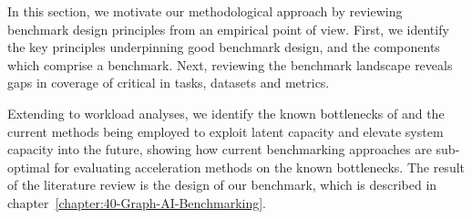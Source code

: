 In this section, we motivate our methodological approach by reviewing benchmark design principles from an empirical point of view.
First, we identify the key principles underpinning good benchmark design, and the components which comprise a benchmark.
Next, reviewing the \gai benchmark landscape reveals gaps in coverage of critical \gai in tasks, datasets and metrics.

Extending to workload analyses, we identify the known bottlenecks of \gai and the current methods being employed to exploit latent capacity and elevate system capacity into the future, showing how current benchmarking approaches are sub-optimal for evaluating acceleration methods on the known bottlenecks. 
The result of the literature review is the design of our benchmark, which is described in chapter~\ref{chapter:40-Graph-AI-Benchmarking}.





